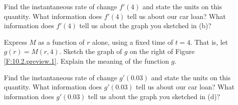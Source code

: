 \begin{pa}
  \item Find the instantaneous rate of change $f'(4)$ and state the units on
    this quantity.  What information does $f'(4)$ tell us about our
    car loan?  What information does $f'(4)$ tell us about the graph
    you sketched in (b)? 

  \item Express $M$ as a function of $r$ alone, using a fixed time of $t=4$.  That is, let $g(r) = M(r, 4)$. Sketch the graph of $g$ on the right of
    Figure \ref{F:10.2.preview.1}.  Explain the meaning of the function $g$.

  \item Find the instantaneous rate of change $g'(0.03)$ and state the units on
    this quantity.  What information does $g'(0.03)$ tell us about our
    car loan?  What information does $g'(0.03)$ tell us about the graph
    you sketched in (d)? 

    \ea


\end{pa} 

